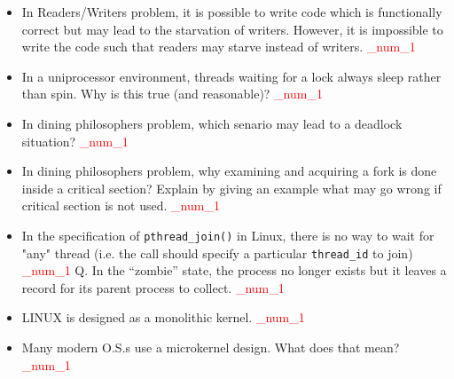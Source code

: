 \documentclass[9pt,landscape]{memoir}
\newcommand{\answer}[1]{\textcolor{red}{_num_1}}
\begin{document}
\begin{multicols}{6}
\begin{itemize}
    \item In Readers/Writers problem, it is possible to write code which is functionally correct but may lead to the starvation of writers. However, it is impossible to write the code such that readers may starve instead of writers. \answer{False. It is possible to write such code.}
    \item In a uniprocessor environment, threads waiting for a lock always sleep rather than spin. Why is this true (and reasonable)? \answer{In a uniprocessor system, only one thread can run at a time. If a thread is spinning for a lock, it is doing nothing but wasting CPU cycles while waiting for the lock to become available. Instead, it is better that they sleep (in the blocked queue) while waiting so that others can use the CPU.  When the lock becomes available, OS will wake them up.}
    \item In dining philosophers problem, which senario may lead to a deadlock situation?  \answer{If the simulation code is written in such a way that each philosopher first acquires the right fork and then attempts to acquire the left fork, a deadlock may occur. Because it is possible that philosophers may enter a circular wait situation in which each one holds the fork on the right and tries to get the fork on the left (which will never happen).}
    \item In dining philosophers problem, why examining and acquiring a fork is done inside a critical section? Explain by giving an example what may go wrong if critical section is not used.  \answer{Each fork is shared by two neighboring philosophers. If it is not handled inside a critical section, both philosophers may think that they acquired the same fork and start eating using the same fork. This situation leads to an incorrect simulation.}
    \item In the specification of \verb$pthread_join()$ in Linux, there is no way to wait for "any" thread (i.e. the call should specify a particular \verb$thread_id$ to join) \answer{True.}
    Q. In the ``zombie'' state, the process no longer exists but it leaves a record for its parent process to collect. \answer{True.}
    \item LINUX is designed as a monolithic kernel. \answer{True. But, with a new twist for expanding OS functionality: LINUX supports dynamically installable modules. A module can be compiled and installed on a running version of the kernel. This is accomplished by providing system calls to install/remove modules.}
    \item Many modern O.S.s use a microkernel design.  What does that mean? \answer{Microkernel is a small privileged OS core that provides process scheduling, memory management, and communication services and relies on other processes to perform some of the functions traditionally associated with the operating system kernel. It removes all nonessential components from the kernel, and implements them as system and user-level programs. The result is a smaller kernel. Amoeba, Chorus, Mach, and Windows/NT use microkernel design approach.}

\end{itemize}
\end{multicols}
\end{document}
